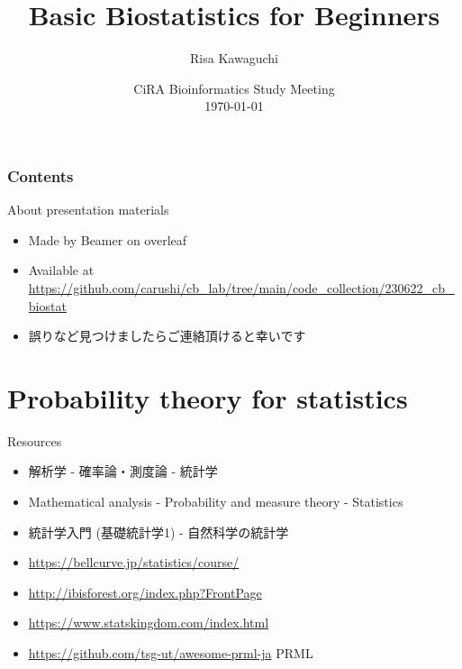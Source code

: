 \documentclass[cjk, aspectratio=169]{beamer}
\def\meetingname{CiRA Bioinformatics Study Meeting}
\begin{document}
\title[Beamer]{Basic Biostatistics for Beginners}
\author[RK]{Risa Kawaguchi} 
\date[\mydate]{\meetingname\\\today}



\begin{frame}
\titlepage
\end{frame}


\begin{frame}
\frametitle{Contents}
\tableofcontents
\end{frame}

\begin{frame}{About presentation materials}
\begin{itemize}
\item Made by Beamer on overleaf
\item Available at \url{https://github.com/carushi/cb_lab/tree/main/code_collection/230622_cb_biostat}
\item 誤りなど見つけましたらご連絡頂けると幸いです
\end{itemize}
\end{frame}

\section{Probability theory for statistics}
\begin{frame}{Resources}
\begin{itemize}
\item 解析学 - 確率論・測度論 - 統計学
\item Mathematical analysis - Probability and measure theory - Statistics
\item 統計学入門 (基礎統計学1) - 自然科学の統計学
\item \url{https://bellcurve.jp/statistics/course/}
\item \url{http://ibisforest.org/index.php?FrontPage}
\item \url{https://www.statskingdom.com/index.html}
\item \url{https://github.com/tsg-ut/awesome-prml-ja} PRML
\end{itemize}
\end{frame}
\end{document}
